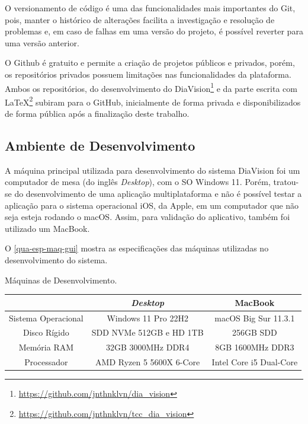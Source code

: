 O versionamento de código é uma das funcionalidades mais importantes do Git, pois, manter o histórico de alterações
facilita a investigação e resolução de problemas e, em caso de falhas em uma versão do projeto, é possível reverter para uma
versão anterior.

O Github é gratuito e permite a criação de projetos públicos e privados, porém, os repositórios privados possuem limitações
nas funcionalidades da plataforma. Ambos os repositórios, do desenvolvimento do DiaVision\footnote{\url{https://github.com/jnthnklvn/dia_vision}}
e da parte escrita com LaTeX\footnote{\url{https://github.com/jnthnklvn/tcc_dia_vision}} subiram para o GitHub,
inicialmente de forma privada e disponibilizados de forma pública após a finalização deste trabalho.

\subsection{Ambiente de Desenvolvimento}

A máquina principal utilizada para desenvolvimento do sistema DiaVision foi um computador de mesa (do inglês \emph{Desktop}), com o SO Windows 11.
Porém, tratou-se do desenvolvimento de uma aplicação multiplataforma e não é possível testar a aplicação para o sistema operacional
iOS, da Apple, em um computador que não seja esteja rodando o macOS. Assim, para validação do aplicativo, também foi
utilizado um MacBook.

O \autoref{qua-esp-maq-gui} mostra as especificações das máquinas utilizadas no desenvolvimento do sistema.

\begin{quadro}[htb!]
    \begin{center}
        \ABNTEXfontereduzida
        \caption{\label{qua-esp-maq-gui}Máquinas de Desenvolvimento.}
        \begin{tabular}{|c|c|c|}
            \hline
                                & \textbf{\emph{Desktop}}  & \textbf{MacBook}        \\
            \hline
            Sistema Operacional & Windows 11 Pro 22H2      & macOS Big Sur 11.3.1    \\
            \hline
            Disco Rígido        & SDD NVMe 512GB e HD 1TB  & 256GB SDD               \\
            \hline
            Memória RAM         & 32GB 3000MHz DDR4        & 8GB 1600MHz DDR3        \\
            \hline
            Processador         & AMD Ryzen 5 5600X 6-Core & Intel Core i5 Dual-Core \\
            \hline
        \end{tabular}
    \end{center}
\end{quadro}

